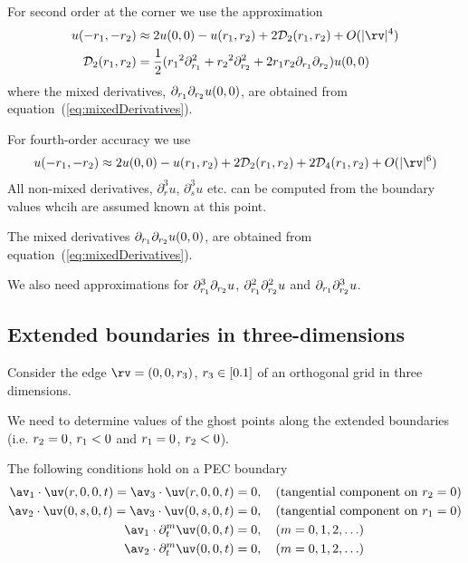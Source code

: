 For second order at the corner we use the approximation
\begin{align}
   u(-\ra,-\rb) &\approx 2 u(0,0) - u(\ra,\rb) + 2\Ds_2(\ra,\rb) + \truncb \\
\Ds_2(\ra,\rb) &= {1\over2}( \ra^2\partial_\ra^2+\rb^2\partial_\rb^2+ 2\ra\rb\partial_\ra\partial_\rb )u(0,0)
\end{align}
where the mixed derivatives, $\partial_{r_1}\partial_{r_2} u(0,0) $,
are obtained from equation~(\ref{eq:mixedDerivatives}). 


For fourth-order accuracy we use
\begin{align}
   u(-\ra,-\rb) &\approx 2 u(0,0) - u(\ra,\rb) + 2\Ds_2(\ra,\rb) + 2\Ds_4(\ra,\rb) + \trunc \\
\end{align}
All non-mixed derivatives, $\partial_r^3 u$, $\partial_s^3 u$ etc. can be computed from the boundary
values whcih are assumed known at this point.

The mixed derivatives $\partial_{r_1}\partial_{r_2} u(0,0) $,
are obtained from equation~(\ref{eq:mixedDerivatives}). 

We also need approximations for $\partial_{r_1}^3\partial_{r_2} u$,
 $\partial_{r_1}^2\partial_{r_2}^2 u$ and $\partial_{r_1}\partial_{r_2}^3 u$.



\clearpage
\subsection{Extended boundaries in three-dimensions}

Consider the edge $\rv=(0,0,\rc)$, ${r_3}\in[0.1]$ of an orthogonal grid in three dimensions. 

We need to determine values of the ghost points along the 
extended boundaries (i.e. ${r_2}=0$, ${r_1}<0$ and ${r_1}=0$, ${r_2}<0$).


The following conditions hold on a PEC boundary
\begin{align*}
  \av_1\cdot\uv(r,0,0,\tc)=\av_3\cdot\uv(r,0,0,\tc) &= 0,  \quad\mbox{(tangential component on $\rb=0$)}\\
  \av_2\cdot\uv(0,s,0,\tc)=\av_3\cdot\uv(0,s,0,\tc) &= 0,  \quad\mbox{(tangential component on $\ra=0$)}\\
  \av_1\cdot\partial_t^m\uv(0,0,t) &= 0, \quad\mbox{($m=0,1,2,\ldots$)} \\
  \av_2\cdot\partial_t^m\uv(0,0,t) &= 0, \quad\mbox{($m=0,1,2,\ldots$)} 
\end{align*}

